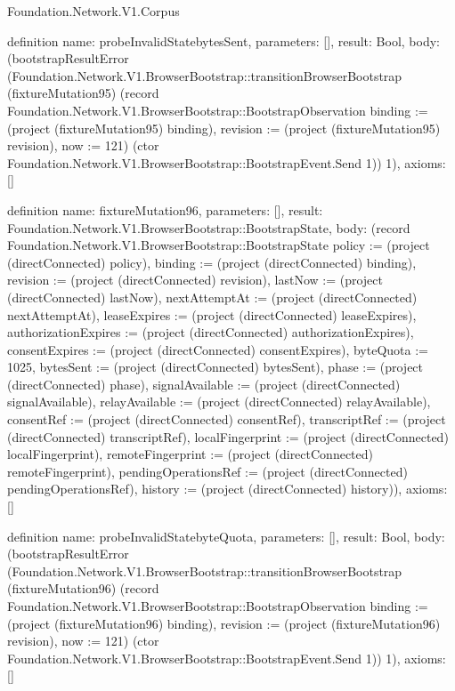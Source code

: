 \begin{lexlean}{Foundation.Network.V1.Corpus}
\begin{semanticmodule}
definition{
  name: probeInvalidStatebytesSent,
  parameters: [],
  result: Bool,
  body: (bootstrapResultError (Foundation.Network.V1.BrowserBootstrap::transitionBrowserBootstrap (fixtureMutation95) (record Foundation.Network.V1.BrowserBootstrap::BootstrapObservation {binding := (project (fixtureMutation95) binding), revision := (project (fixtureMutation95) revision), now := 121}) (ctor Foundation.Network.V1.BrowserBootstrap::BootstrapEvent.Send 1)) 1),
  axioms: []
}

definition{
  name: fixtureMutation96,
  parameters: [],
  result: Foundation.Network.V1.BrowserBootstrap::BootstrapState,
  body: (record Foundation.Network.V1.BrowserBootstrap::BootstrapState {policy := (project (directConnected) policy), binding := (project (directConnected) binding), revision := (project (directConnected) revision), lastNow := (project (directConnected) lastNow), nextAttemptAt := (project (directConnected) nextAttemptAt), leaseExpires := (project (directConnected) leaseExpires), authorizationExpires := (project (directConnected) authorizationExpires), consentExpires := (project (directConnected) consentExpires), byteQuota := 1025, bytesSent := (project (directConnected) bytesSent), phase := (project (directConnected) phase), signalAvailable := (project (directConnected) signalAvailable), relayAvailable := (project (directConnected) relayAvailable), consentRef := (project (directConnected) consentRef), transcriptRef := (project (directConnected) transcriptRef), localFingerprint := (project (directConnected) localFingerprint), remoteFingerprint := (project (directConnected) remoteFingerprint), pendingOperationsRef := (project (directConnected) pendingOperationsRef), history := (project (directConnected) history)}),
  axioms: []
}

definition{
  name: probeInvalidStatebyteQuota,
  parameters: [],
  result: Bool,
  body: (bootstrapResultError (Foundation.Network.V1.BrowserBootstrap::transitionBrowserBootstrap (fixtureMutation96) (record Foundation.Network.V1.BrowserBootstrap::BootstrapObservation {binding := (project (fixtureMutation96) binding), revision := (project (fixtureMutation96) revision), now := 121}) (ctor Foundation.Network.V1.BrowserBootstrap::BootstrapEvent.Send 1)) 1),
  axioms: []
}


\end{semanticmodule}
\end{lexlean}
